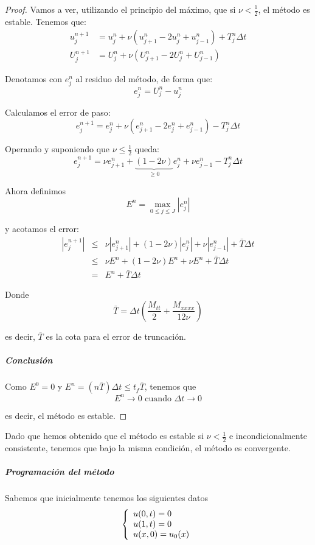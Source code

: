 \begin{proof}
	
Vamos a ver, utilizando el principio del máximo, que si $\nu < \frac{1}{2}$, el método es estable. Tenemos que:
\begin{align*}
u_j^{n+1} &= u_j^n + \nu (u_{j+1}^n-2u_j^n+u_{j-1}^n) + T_j^n \Delta t\\
U_j^{n+1} &= U_j^n + \nu (U_{j+1}^n-2U_j^n+U_{j-1}^n)
\end{align*}

Denotamos con $e_j^n$ al residuo del método, de forma que:
$$e_j^n = U_j^n - u_j^n$$

Calculamos el error de paso:
$$e_j^{n+1} = e_j^n + \nu (e_{j+1}^n-2e_j^n+e_{j-1}^n) - T_j^n \Delta t$$

Operando y suponiendo que $\nu \le \frac{1}{2}$ queda:
$$e_j^{n+1} = \nu e_{j+1}^n + \underbrace{(1-2\nu)}_{\ge 0} e_j^n + \nu e_{j-1}^n - T_j^n \Delta t$$

Ahora definimos
$$E^n = \max_{0\le j \le J} |e_j^n|$$

y acotamos el error:
\begin{equation*}
	\begin{array}{lll}
	|e_j^{n+1}| &\le& \nu|e_{j+1}^n| + (1-2\nu) |e_j^n| + \nu |e_{j-1}^n| +  \bar{T}\Delta t\\
	&\le& \nu E^n +(1-2\nu)E^n + \nu E^n + \bar{T}\Delta t\\
	&=& E^n + \bar{T} \Delta t
	\end{array}
\end{equation*}

Donde $$\bar{T} = \Delta t \left( \frac{M_{tt}}{2} + \frac{M_{xxxx}}{12\nu}  \right)$$

es decir, $\bar{T}$ es la cota para el error de truncación. 

\subparagraph*{Conclusión}\mbox{}

Como $E^0 = 0$ y $E^n = (n\bar{T})\Delta t \le t_f \bar{T}$, tenemos que $$E^n \to 0 \text{ cuando }\Delta t \to 0$$ 

es decir, el método es estable.
\end{proof}

Dado que hemos obtenido que el método es estable si $\nu <\frac{1}{2}$ e incondicionalmente consistente, tenemos que bajo la misma condición, el método es convergente.

\newpage

\subparagraph{Programación del método}\mbox{}

Sabemos que inicialmente tenemos los siguientes datos
\begin{equation*}
	\left\{
	\begin{array}{l r}
		u(0,t) = 0\\
		u(1,t) = 0\\
		u(x,0) = u_0(x)
	\end{array}
	\right.
\end{equation*}

